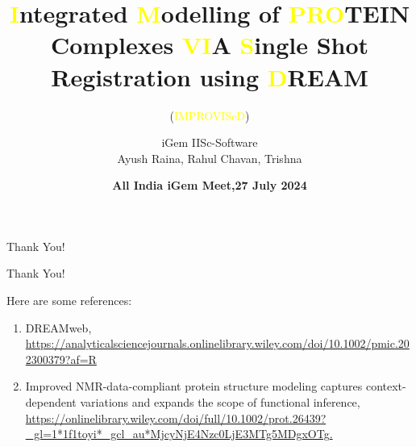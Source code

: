 \documentclass{beamer}
\author{iGem IISc-Software \\ Ayush Raina, Rahul Chavan, Trishna}
\title{\textcolor{yellow}{I}ntegrated \textcolor{yellow}{M}odelling of \textcolor{yellow}{PRO}TEIN Complexes \textcolor{yellow}{VI}A \textcolor{yellow}{S}ingle Shot Registration using \textcolor{yellow}{D}REAM}
\subtitle{(\textcolor{yellow}{IMPROVISeD})}
\date{\textcolor{mycolor}{\textbf{All India iGem Meet,27 July 2024}}}
\begin{document}
\begin{frame}
    \titlepage
\end{frame}







\begin{frame}{Thank You!}
    \begin{center}
        \Huge Thank You!
    \end{center}
    Here are some references:
    \begin{enumerate}
        \item DREAMweb, \url{https://analyticalsciencejournals.onlinelibrary.wiley.com/doi/10.1002/pmic.202300379?af=R}
        \item Improved NMR-data-compliant protein structure modeling captures context-dependent variations and expands the scope of functional inference, \url{https://onlinelibrary.wiley.com/doi/full/10.1002/prot.26439?_gl=1*1f1toyi*_gcl_au*MjcyNjE4Nzc0LjE3MTg5MDgxOTg.}
    \end{enumerate}
\end{frame}
\end{document}
